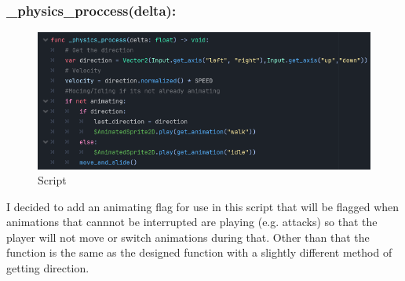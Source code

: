 \documentclass{article}
\begin{document}
        \subsubsection{\_physics\_proccess(delta):}
        \begin{figure}[H]
                \centering
                \includegraphics[width = 0.8\columnwidth]{images/development/Player_physics_process().PNG}
                \caption{Script}
        \end{figure}
        \noindent I decided to add an animating flag for use in this script that will be flagged when animations that cannnot be interrupted are playing (e.g. attacks) so that the player will not move or switch animations during that. Other than that the function is the same as the designed function with a slightly different method of getting direction.\\
\newpage
\end{document}
